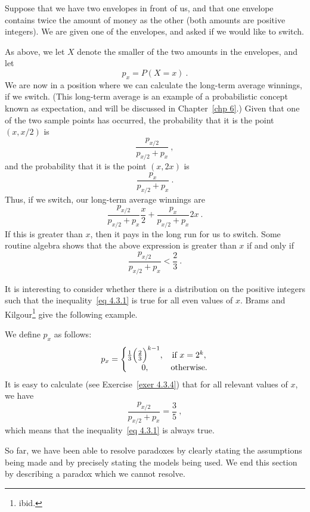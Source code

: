 \begin{example}\label{exam 4.3.5}
Suppose that we have two envelopes in front of us, and that one envelope contains
twice the amount of money as the other (both amounts are positive integers).  We are given
one of the envelopes, and asked if we would like to switch.
\par
As above, we let $X$ denote the smaller of the two amounts in the envelopes, and let 
$$p_x = P(X = x)\ .$$
We are now in a position where we can calculate the long-term average winnings, if we switch.  
(This long-term average is an example of a probabilistic concept known as expectation, and
will be discussed in Chapter~\ref{chp 6}.)  Given that one of the two sample points has 
occurred, the probability that it is the point $(x, x/2)$ is
$$\frac{p_{x/2}}{p_{x/2} + p_x}\ ,$$
and the probability that it is the point $(x, 2x)$ is
$$\frac{p_x}{p_{x/2} + p_x}\ .$$
Thus, if we switch, our long-term average winnings are
$$\frac{p_{x/2}}{p_{x/2} + p_x}\frac x2 + \frac{p_x}{p_{x/2} + p_x} 2x\ .$$
If this is greater than $x$, then it pays in the long run for us to switch.
Some routine algebra shows that the above expression is greater than $x$ if and only
if
\begin{equation}
\frac{p_{x/2}}{p_{x/2} + p_x} < \frac 23\ .
\label{eq 4.3.1}
\end{equation}
\par
It is interesting to consider whether there is a distribution on the positive integers
such that the inequality~\ref{eq 4.3.1} is true for all even values of $x$.  Brams and 
Kilgour\footnote{ibid.} give the following example.
\par
We define $p_x$ as follows:
$$
p_x = \left \{ \begin{matrix}
               \frac 13 \Bigl(\frac 23\Bigr)^{k-1}, & \mbox{if}\,\, x = 2^k, \cr
               0, & \mbox{otherwise.}\cr
\end{matrix}\right.
$$
It is easy to calculate (see Exercise~\ref{exer 4.3.4}) that for all relevant values of $x$, 
we have
$$
\frac{p_{x/2}}{p_{x/2} + p_x} = \frac 35\ ,
$$
which means that the inequality~\ref{eq 4.3.1} is always true.
\end{example}

So far, we have been able to resolve paradoxes by clearly stating the assumptions being made
and by precisely stating the models being used.  We end this section by describing a paradox
which we cannot resolve.

